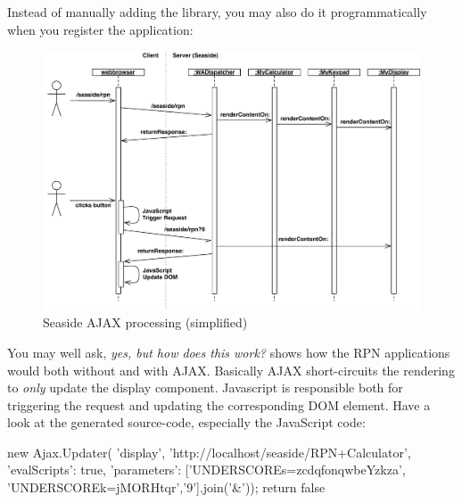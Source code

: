 \documentclass[a4paper,10pt,twoside]{book}
\begin{document}

Instead of manually adding the library, you may also do it programmatically when you register the application:
\begin{code}{}
MyCalculator class>>>initialize
	(self registerAsApplication: 'rpn')
		addLibrary: SULibrary}}
\end{code}

\begin{figure}[ht]
\begin{center}
\includegraphics[width=\textwidth]{ajax-processing}
\caption{Seaside AJAX processing (simplified)}
\end{center}
\end{figure}


You may well ask, \emph{yes, but how does this work?}
 shows how the RPN applications would both without and with AJAX.
Basically AJAX short-circuits the rendering to \emph{only} update the display component.
Javascript is responsible both for triggering the request and updating the corresponding DOM element.
Have a look at the generated source-code, especially the JavaScript code:

\begin{code}{}
new Ajax.Updater(
	'display',
	'http://localhost/seaside/RPN+Calculator',
	{'evalScripts': true,
	  'parameters': ['UNDERSCOREs=zcdqfonqwbeYzkza', 'UNDERSCOREk=jMORHtqr','9'].join('&')});
return false
\end{code}
\end{document}
